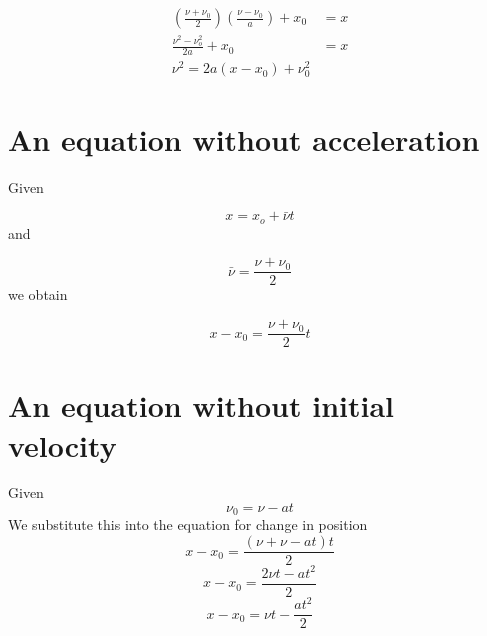 \documentclass{article}
\begin{document}
\begin{align*}
	\left( \frac{\nu + \nu_0}{2} \right) \left( \frac{\nu - \nu_0}{a} \right) + x_0 &= x \\
	\frac{\nu^2 - \nu_o^2}{2a} + x_0 &= x \\
	\nu^2 = 2a \left( x - x_0 \right) + \nu_0^2
\end{align*}

\section*{An equation without acceleration}
Given

\[
	x = x_o + \bar{\nu}t
\]
and

\[
	\bar{\nu} = \frac{\nu + \nu_0}{2}
\]
we obtain

\[
	x - x_0 = \frac{\nu + \nu_0}{2} t
\]

\section*{An equation without initial velocity}
Given
\[
	\nu_0 = \nu - at
\]
We substitute this into the equation for change in position
\[
	x - x_0 = \frac{\left( \nu + \nu - at \right) t}{2}
\]
\[
	x - x_0 = \frac{2\nu t - at^2}{2}
\]
\[
	x - x_0 = \nu t - \frac{at^2}{2}
\]
\end{document}
